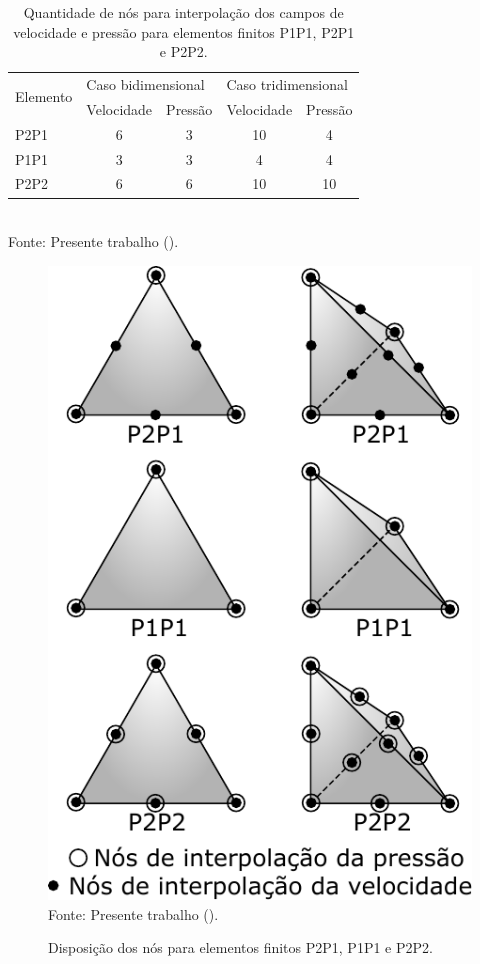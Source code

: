 \begin{table}[h!]
    \centering
    \caption{Quantidade de nós para interpolação dos campos de velocidade e pressão para elementos finitos P1P1, P2P1 e P2P2.}
    \begin{tabular}{lcccc}
        \hline
        \multirow{2}{*}{Elemento} & \multicolumn{2}{l}{Caso bidimensional} & \multicolumn{2}{l}{Caso tridimensional}                        \\\cline{2-5}
                                  & Velocidade                             & Pressão                                 & Velocidade & Pressão \\\hline
        P2P1                      & 6                                      & 3                                       & 10         & 4       \\
        P1P1                      & 3                                      & 3                                       & 4          & 4       \\
        P2P2                      & 6                                      & 6                                       & 10         & 10      \\\hline
    \end{tabular}
    \\Fonte: Presente trabalho (\the\year).
    \label{tab:Elementos}
\end{table}

\begin{figure}[h!]
    \centering
    \caption{Disposição dos nós para elementos finitos P2P1, P1P1 e P2P2.}
    \includegraphics[width=.35\linewidth]{Figuras/Elementos.pdf}
    \\Fonte: Presente trabalho (\the\year).
    \label{fig:Elementos}
\end{figure}




% 

